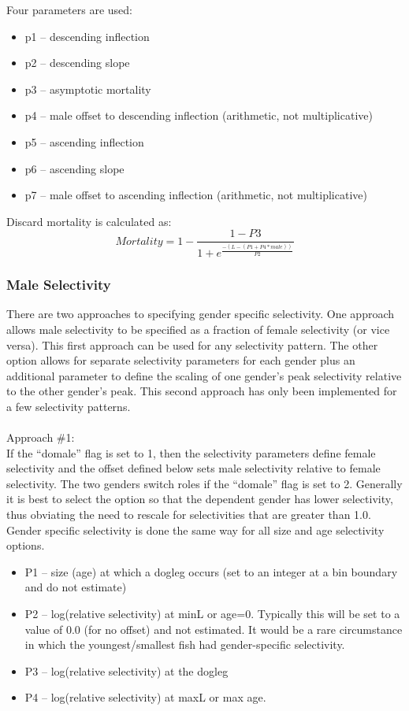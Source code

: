 Four parameters are used:
\begin{itemize}
	\item p1 – descending inflection
	\item p2 – descending slope
	\item p3 – asymptotic mortality
	\item p4 – male offset to descending inflection (arithmetic, not multiplicative)
	\item p5 – ascending inflection
	\item p6 – ascending slope
	\item p7 – male offset to ascending inflection (arithmetic, not multiplicative)
\end{itemize}

Discard mortality is calculated as:
\begin{equation}
	Mortality = 1 - \frac{1-P3}{1+e^{\frac{-(L-(P1+P4*male))}{P2}}}
\end{equation}

\subsubsection{Male Selectivity}
There are two approaches to specifying gender specific selectivity.  One approach allows male selectivity to be specified as a fraction of female selectivity (or vice versa).  This first approach can be used for any selectivity pattern.  The other option allows for separate selectivity parameters for each gender plus an additional parameter to define the scaling of one gender’s peak selectivity relative to the other gender’s peak.  This second approach has only been implemented for a few selectivity patterns.\\
\\
Approach \#1:\\
If the “domale” flag is set to 1, then the selectivity parameters define female selectivity and the offset defined below sets male selectivity relative to female selectivity.  The two genders switch roles if the “domale” flag is set to 2.  Generally it is best to select the option so that the dependent gender has lower selectivity, thus obviating the need to rescale for selectivities that are greater than 1.0.  Gender specific selectivity is done the same way for all size and age selectivity options.
\begin{itemize}
	\item P1 – size (age) at which a dogleg occurs (set to an integer at a bin boundary and do not estimate)
	\item P2 – log(relative selectivity) at minL or age=0.  Typically this will be set to a value of 0.0 (for no offset) and not estimated.  It would be a rare circumstance in which the youngest/smallest fish had gender-specific selectivity.
	\item P3 – log(relative selectivity) at the dogleg
	\item P4 – log(relative selectivity) at maxL or max age.
\end{itemize}

